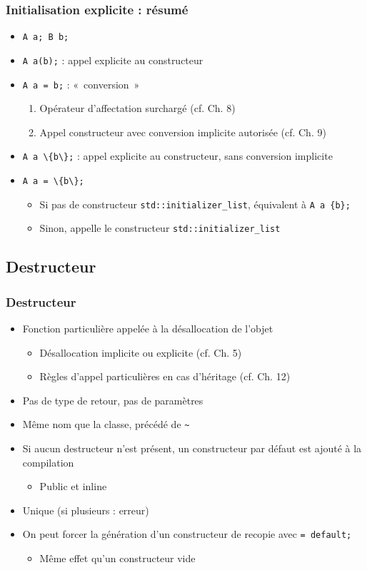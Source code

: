 \begin{frame}
\frametitle{Initialisation explicite : résumé}
\begin{itemize}[<+->]
\item \texttt{A a; B b;}
\item \lstinline|A a(b);| : appel explicite au constructeur
\item \lstinline|A a = b;| : «~conversion~»
	\begin{enumerate}
	\item Opérateur d'affectation surchargé (cf. Ch. 8)
	\item Appel constructeur avec conversion implicite autorisée (cf. Ch. 9)
	\end{enumerate}
\item \lstinline|A a \{b\};| : appel explicite au constructeur, sans conversion implicite
\item \lstinline|A a = \{b\};|
	\begin{itemize}
	\item Si pas de constructeur \texttt{std::initializer\_list}, équivalent à \lstinline|A a {b};|
	\item Sinon, appelle le constructeur \texttt{std::initializer\_list}
	\end{itemize}
\end{itemize}
\end{frame}

\subsection{Destructeur}

\begin{frame}
\frametitle{Destructeur}
\begin{itemize}[<+->]
\item Fonction particulière appelée à la désallocation de l'objet
	\begin{itemize}
	\item Désallocation implicite ou explicite (cf. Ch. 5)
	\item Règles d'appel particulières en cas d'héritage (cf. Ch. 12)
	\end{itemize}
\item Pas de type de retour, pas de paramètres
\item Même nom que la classe, précédé de \texttt{\~}
\item Si aucun destructeur n'est présent, un constructeur par défaut est ajouté à la compilation
	\begin{itemize}
	\item Public et inline
	\end{itemize}
\item Unique (si plusieurs : erreur)
\item On peut forcer la génération d'un constructeur de recopie avec \lstinline|= default;|
	\begin{itemize}
	\item Même effet qu'un constructeur vide
	\end{itemize}
\end{itemize}
\end{frame}

